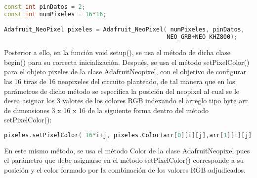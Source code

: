 \documentclass{article}
\begin{document}
\begin{lstlisting}[language=C++, label=constructor_neopix]
const int pinDatos = 2;
const int numPixeles = 16*16;

Adafruit_NeoPixel pixeles = Adafruit_NeoPixel( numPixeles, pinDatos,
                                              NEO_GRB+NEO_KHZ800);
\end{lstlisting}
Posterior a ello, en la función void setup(), se usa el método de dicha clase begin() para su correcta inicialización. Después, se usa el método setPixelColor() para el objeto pixeles de la clase AdafruitNeopixel, con el objetivo de configurar las 16 tiras de 16 neopixeles del circuito planteado, de tal manera que en los parámetros de dicho método se especifica la posición del neopixel al cual se le desea asignar los 3 valores de los colores RGB indexando el arreglo tipo byte arr de dimensiones 3 x 16 x 16 de la siguiente forma dentro del método setPixelColor():
\begin{lstlisting}[language=C++, label=setpixelcolor_neopix]
pixeles.setPixelColor( 16*i+j, pixeles.Color(arr[0][i][j],arr[1][i][j],arr[2][i][j]));
\end{lstlisting}
En este mismo método, se usa el método Color de la clase AdafruitNeopixel pues el parámetro que debe asignarse en el método setPixelColor() corresponde a su posición y el color formado por la combinación de los valores RGB adjudicados.
\end{document}
